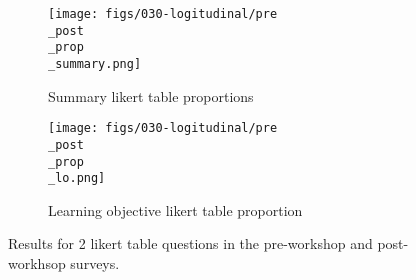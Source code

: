 \documentclass[../main.tex]{subfiles}
\begin{document}
      \begin{figure}[htb]
        \centering
        \begin{subfigure}[h]{0.45\textwidth}
            \centering
            \texttt{[image: figs/030-logitudinal/pre\\\_post\\\_prop\\\_summary.png]}
            \caption[Proportion of summary Likert table results]
            {Summary likert table proportions}
            \label{sfig:pre-post-prop-summary}
        \end{subfigure}
        \hfill
        \begin{subfigure}[h]{0.45\textwidth}
            \centering
            \texttt{[image: figs/030-logitudinal/pre\\\_post\\\_prop\\\_lo.png]}
            \caption[Proportion of learning objective Likert table results]
            {Learning objective likert table proportion}
            \label{sfig:pre-post-prop-lo}
        \end{subfigure}
        \caption[Summary table and learning objective likert proportion (pre, post)]
        {Results for 2 likert table questions in the
            pre-workshop and post-workhsop surveys.
        }
        \label{fig:pre-post-prop-summary-lo}
    \end{figure}
\end{document}
